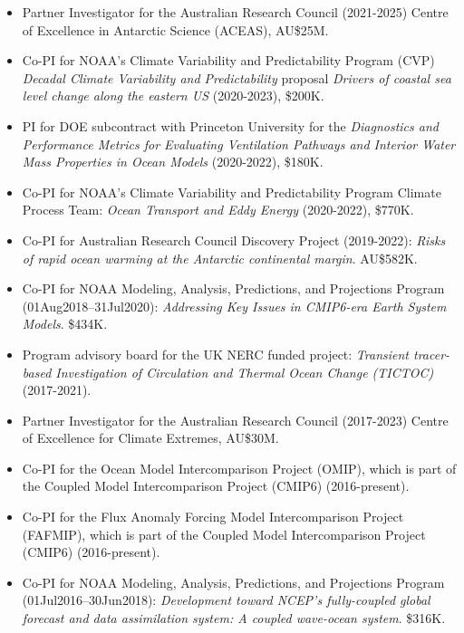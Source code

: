 \documentclass{article}
\begin{document}
\begin{itemize}[leftmargin=*]

\item Partner Investigator for the Australian Research Council (2021-2025) Centre of Excellence in Antarctic Science (ACEAS), AU\$25M.
  
\item Co-PI for NOAA's Climate Variability and Predictability Program (CVP) {\it Decadal Climate Variability and Predictability} proposal {\it Drivers of coastal sea level change along the eastern US} (2020-2023), \$200K.  

\item PI for DOE subcontract with Princeton University for the {\it Diagnostics and Performance Metrics for Evaluating Ventilation Pathways and Interior Water Mass Properties in Ocean Models} (2020-2022), \$180K. 

\item Co-PI for NOAA's Climate Variability and Predictability Program Climate Process Team: {\it Ocean Transport and Eddy Energy} (2020-2022), \$770K.

\item Co-PI for Australian Research Council Discovery Project (2019-2022): {\it Risks of rapid ocean warming at the Antarctic continental margin}. AU\$582K.

\item Co-PI for NOAA Modeling, Analysis, Predictions, and Projections Program (01Aug2018--31Jul2020): {\it Addressing Key Issues in CMIP6-era Earth System Models}. \$434K.
    
\item Program advisory board for the UK NERC funded project: {\it Transient tracer-based Investigation of Circulation and Thermal Ocean Change (TICTOC)} (2017-2021).

\item Partner Investigator for the Australian Research Council (2017-2023) Centre of Excellence for Climate Extremes, AU\$30M.
  
\item Co-PI for the Ocean Model Intercomparison Project (OMIP), which is part of the Coupled Model Intercomparison Project (CMIP6) (2016-present).    

\item Co-PI for the Flux Anomaly Forcing Model Intercomparison Project (FAFMIP), which is part of the Coupled Model Intercomparison Project (CMIP6) (2016-present).    

\item Co-PI for NOAA Modeling, Analysis, Predictions, and Projections Program (01Jul2016--30Jun2018): {\it Development toward NCEP's fully-coupled global forecast and data assimilation system: A coupled wave-ocean
system}.  \$316K.


\end{itemize}
\end{document}
